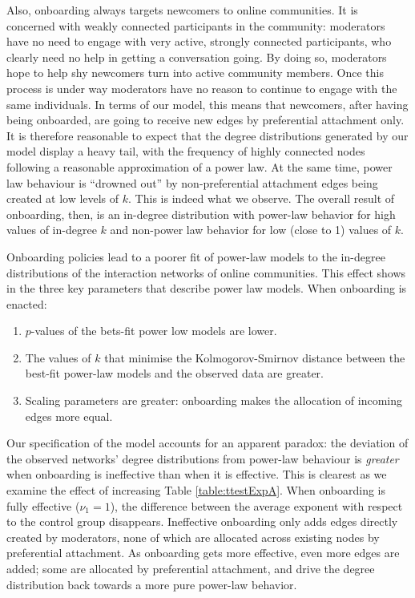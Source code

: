 \documentclass{bmcart}
\begin{document}
Also, onboarding always targets newcomers to online communities. It is concerned with weakly connected participants in the community: moderators have no need to engage with very active, strongly connected participants, who clearly need no help in getting a conversation going. By doing so, moderators hope to help shy newcomers turn into active community members. Once this process is under way moderators have no reason to continue to engage with the same individuals. In terms of our model, this means that newcomers, after having being onboarded, are going to receive new edges by preferential attachment only. It is therefore reasonable to expect that the degree distributions generated by our model display a heavy tail, with the frequency of highly connected nodes following a reasonable approximation of a power law. At the same time, power law behaviour is ``drowned out'' by non-preferential attachment edges being created at low levels of $k$. This is indeed what we observe. The overall result of onboarding, then, is an in-degree distribution with power-law behavior for high values of in-degree $k$ and non-power law behavior for low (close to 1) values of $k$. 

Onboarding policies lead to a poorer fit of power-law models to the in-degree distributions of the interaction networks of online communities. This effect shows in the three key parameters that describe power law models. When onboarding is enacted:

\begin {enumerate}
\item $p$-values of the bets-fit power low models are lower. 
\item The values of $k$ that minimise the Kolmogorov-Smirnov distance between the best-fit power-law models and the observed data are greater. 
\item Scaling parameters are greater: onboarding makes the allocation of incoming edges more equal. 
\end{enumerate}

Our specification of the model accounts for an apparent paradox: the deviation of the observed networks' degree distributions from power-law behaviour is \emph{greater} when onboarding is ineffective than when it is effective. This is clearest as we examine the effect of increasing Table \ref{table:ttestExpA}. When onboarding is fully effective ($\nu_1 = 1$), the difference between the average exponent with respect to the control group disappears. Ineffective onboarding only adds edges directly created by moderators, none of which are allocated across existing nodes by preferential attachment. As onboarding gets more effective, even more edges are added; some are allocated by preferential attachment, and drive the degree distribution back towards a more pure power-law behavior. 
\end{document}
